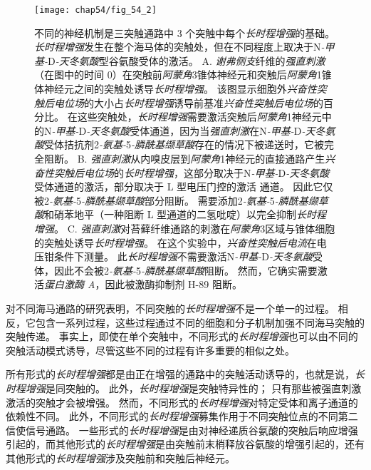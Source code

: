 \begin{figure}[htbp]
	\centering
	\texttt{[image: chap54/fig\_54\_2]}
	\caption{不同的神经机制是三突触通路中 3 个突触中每个\textit{长时程增强}的基础。
		\textit{长时程增强}发生在整个海马体的突触处，但在不同程度上取决于N\textit{-甲基-}D\textit{-天冬氨酸}型谷氨酸受体的激活。
		A. \textit{谢弗侧支}纤维的\textit{强直刺激}（在图中的时间 0）在突触前\textit{阿蒙角}3锥体神经元和突触后\textit{阿蒙角}1锥体神经元之间的突触处诱导\textit{长时程增强}。
		该图显示细胞外\textit{兴奋性突触后电位场}的大小占\textit{长时程增强}诱导前基准\textit{兴奋性突触后电位场}的百分比。
		在这些突触处，\textit{长时程增强}需要激活突触后\textit{阿蒙角}1神经元中的N\textit{-甲基-}D\textit{-天冬氨酸}受体通道，因为当\textit{强直刺激}在N\textit{-甲基-}D\textit{-天冬氨酸}受体拮抗剂2\textit{-氨基-}5\textit{-膦酰基缬草酸}存在的情况下被递送时，它被完全阻断\cite{morgan2001electrical}。
		B. \textit{强直刺激}从内嗅皮层到\textit{阿蒙角}1神经元的直接通路产生\textit{兴奋性突触后电位场}的\textit{长时程增强}，这部分取决于N\textit{-甲基-}D\textit{-天冬氨酸}受体通道的激活，部分取决于 L 型电压门控的激活  通道。
		因此它仅被2\textit{-氨基-}5\textit{-膦酰基缬草酸}部分阻断。
		需要添加2\textit{-氨基-}5\textit{-膦酰基缬草酸}和硝苯地平（一种阻断 L 型通道的二氢吡啶）以完全抑制\textit{长时程增强}。
		C. \textit{强直刺激}对苔藓纤维通路的刺激在\textit{阿蒙角}3区域与锥体细胞的突触处诱导\textit{长时程增强}。
		在这个实验中，\textit{兴奋性突触后电流}在电压钳条件下测量。
		此\textit{长时程增强}不需要激活N\textit{-甲基-}D\textit{-天冬氨酸}受体，因此不会被2\textit{-氨基-}5\textit{-膦酰基缬草酸}阻断。
		然而，它确实需要激活\textit{蛋白激酶 A}，因此被激酶抑制剂 H-89 阻断\cite{zalutsky1990comparison}。}
	\label{fig:54_2}
\end{figure}


对不同海马通路的研究表明，不同突触的\textit{长时程增强}不是一个单一的过程。
相反，它包含一系列过程，这些过程通过不同的细胞和分子机制加强不同海马突触的突触传递。
事实上，即使在单个突触中，不同形式的\textit{长时程增强}也可以由不同的突触活动模式诱导，尽管这些不同的过程有许多重要的相似之处。


所有形式的\textit{长时程增强}都是由正在增强的通路中的突触活动诱导的，也就是说，\textit{长时程增强}是同突触的。
此外，\textit{长时程增强}是突触特异性的；
只有那些被强直刺激激活的突触才会被增强。
然而，不同形式的\textit{长时程增强}对特定受体和离子通道的依赖性不同。
此外，不同形式的\textit{长时程增强}募集作用于不同突触位点的不同第二信使信号通路。
一些形式的\textit{长时程增强}是由对神经递质谷氨酸的突触后响应增强引起的，而其他形式的\textit{长时程增强}是由突触前末梢释放谷氨酸的增强引起的，还有其他形式的\textit{长时程增强}涉及突触前和突触后神经元。


